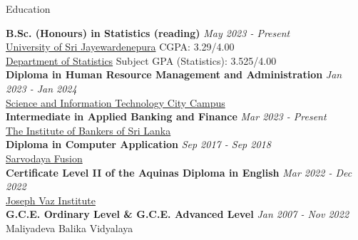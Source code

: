 \documentclass{resume} %
\begin{document}
	
	
	\begin{rSection}{Education}
		
		{\bf B.Sc. (Honours) in Statistics (reading)} \href{https://github.com/amalirajapaksha/CV/blob/main/STA.png}{\faExternalLink} \hfill {\em May 2023 - Present}  
		\\ \href{https://www.sjp.ac.lk/}{University of Sri Jayewardenepura} \hfill {CGPA: 3.29/4.00}
		\\ \href{https://science.sjp.ac.lk/sta/undergraduate/}{Department of Statistics} \hfill {Subject GPA (Statistics): 3.525/4.00} \\
		
		{\bf Diploma in Human Resource Management and Administration}
		\href{https://github.com/amalirajapaksha/CV/blob/main/SITC.jpeg}{\faExternalLink} \hfill {\em Jan 2023 - Jan 2024} 
		\\ \href{https://sitc.lk/}{Science and Information Technology City Campus} \\
		
		{\bf Intermediate in Applied Banking and Finance}
		\href{https://github.com/amalirajapaksha/CV/blob/main/IBSL.jpeg}{\faExternalLink} \hfill {\em Mar 2023 - Present} 
		\\ \href{https://www.ibsl.lk/}{The Institute of Bankers of Sri Lanka} \\
		
		{\bf Diploma in Computer Application}
		\href{https://github.com/amalirajapaksha/CV/blob/main/Sarvodaya.jpeg}{\faExternalLink} \hfill {\em Sep 2017 - Sep 2018} 
		\\ \href{https://www.sarvodayafusion.org/}{Sarvodaya Fusion} \\
		
		{\bf Certificate Level II of the Aquinas Diploma in English}
		\href{https://github.com/amalirajapaksha/CV/blob/main/Aquinas.jpeg}{\faExternalLink} \hfill {\em Mar 2022 - Dec 2022} 
		\\ \href{https://jvi.lk/}{Joseph Vaz Institute} \\
		
		{\bf G.C.E. Ordinary Level \& G.C.E. Advanced Level} \href{http://maliyadevabalika.lk/}{\faExternalLink} \hfill {\em Jan 2007 - Nov 2022} 
		\\ Maliyadeva Balika Vidyalaya
		\\ 
		
	\end{rSection}
	
\end{document}
